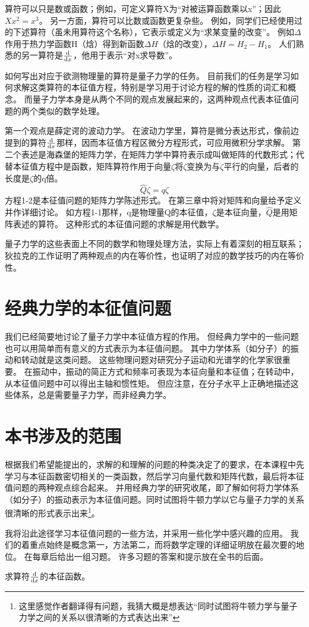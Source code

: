 算符可以只是数或函数；例如，可定义算符X为“对被运算函数乘以x”；因此$Xx^2=x^3$。
另一方面，算符可以比数或函数更复杂些。
例如，同学们已经使用过的下述算符（虽未用算符这个名称），它表示或定义为“求某变量的改变”。
例如$\Delta$作用于热力学函数H（焓）得到新函数$\Delta H$（焓的改变），$\Delta H=H_2-H_1$。
人们熟悉的另一算符是$\dv{x}$，他用于表示“对x求导数”。

如何写出对应于欲测物理量的算符是量子力学的任务。
目前我们的任务是学习如何求解这类算符的本征值方程，特别是学习用于讨论方程的解的性质的词汇和概念。
而量子力学本身是从两个不同的观点发展起来的，这两种观点代表本征值问题的两个类似的数学处理。

第一个观点是薛定谔的波动力学。
在波动力学里，算符是微分表达形式，像前边提到的算符$\dv{x}$那样，因而本征值方程区微分方程形式，可应用微积分学求解。
第二个表述是海森堡的矩阵力学，在矩阵力学中算符表示成叫做矩阵的代数形式；代替本征值方程中是函数，矩阵算符作用于向量$\zeta$将$\zeta$变换为与$\zeta$平行的向量，后者的长度是$\zeta$的q倍。
\[\hat{Q}\zeta=q\zeta \tag{1-2}\]
方程1-2是本征值问题的矩阵力学陈述形式。
在第三章中将对矩阵和向量给予定义并作详细讨论。
如方程1-1那样，q是物理量Q的本征值，$\zeta$是本征向量，$\hat{Q}$是用矩阵表述的算符。
这种形式的本征值问题的求解是用代数学。

量子力学的这些表面上不同的数学和物理处理方法，实际上有着深刻的相互联系；狄拉克的工作证明了两种观点的内在等价性，也证明了对应的数学技巧的内在等价性。

\section{经典力学的本征值问题}
我们已经简要地讨论了量子力学中本征值方程的作用。
但经典力学中的一些问题也可以用简单而有意义的方式表示为本征值问题。
其中力学体系（如分子）的振动和转动就是这类问题。
这些物理问题对研究分子运动和光谱学的化学家很重要。
在振动中，振动的简正方式和频率可表现为本征向量和本征值；在转动中，从本征值问题中可以得出主轴和惯性矩。
但应注意，在分子水平上正确地描述这些体系，总是需要量子力学，而非经典力学。

\section{本书涉及的范围}
根据我们希望能提出的，求解的和理解的问题的种类决定了的要求，在本课程中先学习与本征函数密切相关的一类函数，然后学习向量代数和矩阵代数，最后将本征值问题的两种观点综合起来。
并用经典力学的研究收尾，即了解如何将力学体系（如分子）的振动表示为本征值问题。同时试图将牛顿力学以它与量子力学的关系很清晰的形式表示出来\footnote{这里感觉作者翻译得有问题，我猜大概是想表达“同时试图将牛顿力学与量子力学之间的关系以很清晰的方式表达出来”}。

我将沿此途径学习本征值问题的一些方法，并采用一些化学中感兴趣的应用。
我们的着重点始终是概念第一，方法第二，而将数学定理的详细证明放在最次要的地位。
在每章后给出一组习题。
许多习题的答案和提示放在全书的后面。

\begin{problemset}
    \item 求算符$\dv{x}$的本征函数。
\end{problemset}
